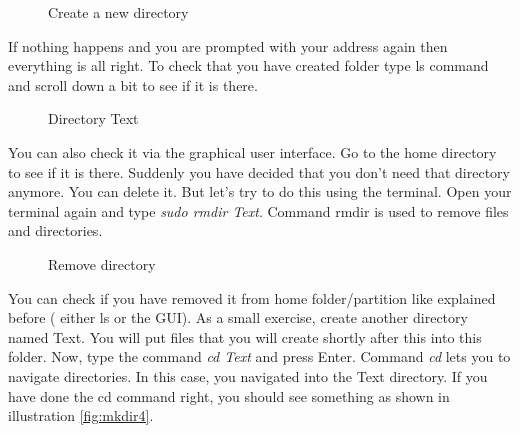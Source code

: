 \begin{figure}[h!]	
	\centering
	\caption{Create a new directory}	
	\label{fig:mkdir1}	
\end{figure}

\par \noindent If nothing happens and you are prompted with your address again then everything is all right. To check that you have created folder type ls command and scroll down a bit to see if it is there. 

\begin{figure}[h!]	
	\centering
	\caption{Directory Text}	
	\label{fig:mkdir2}	
\end{figure}
 
\par \noindent You can also check it via the graphical user interface. Go to the home directory to see if it is there. Suddenly you have decided that  you don't need that directory anymore. You can delete it. But let's try to do this using the terminal. Open your terminal again and type \textit{sudo rmdir Text}. Command rmdir is used to remove files and directories.

\begin{figure}[h!]	
	\centering
	\caption{Remove directory}	
	\label{fig:rmdir1}	
\end{figure}

\par \noindent You can check if you have removed it from home folder/partition like explained before ( either ls or the GUI). As a small exercise, create another directory named Text. You will put files that you will create shortly after this into this folder. Now, type the command \textit{cd Text} and press Enter.  Command \textit{cd} lets you to navigate directories. In this case, you navigated into the Text directory. If you have done the cd command right, you should see something as shown in  illustration \ref{fig:mkdir4}.\\

